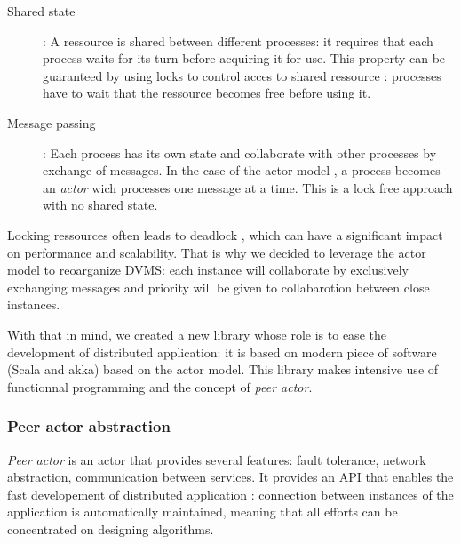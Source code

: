 \begin{description}

	\item [Shared state] : A ressource is shared between different processes: it
	requires that each process waits for its turn before acquiring it for use.
	This property can be guaranteed by using locks to control acces to shared
	ressource : processes have to wait that the ressource becomes free
	before using it.

	\item [Message passing] : Each process has its own state and collaborate
	with other processes by exchange of messages. In the case of the actor model 
	\cite{Hewitt1973}, a process becomes an \emph{actor} wich processes one
	message at a time. This is a lock free approach with no	shared state.

\end{description}

Locking ressources often leads to deadlock \cite{agha:1986}, which can have
a significant impact on performance and scalability. That is why we decided to
leverage the actor model to reoarganize DVMS: each instance will collaborate
by exclusively exchanging messages and priority will be given to collabarotion
between close instances.

With that in mind, we created a new library whose role is to ease the
development of distributed application: it is based on modern piece of software
(Scala and akka) based on the actor model. This library makes intensive use of
functionnal programming and the concept of \emph{peer actor}.

\subsubsection{Peer actor abstraction}

\emph{Peer actor} is an actor that provides several features: fault tolerance,
network abstraction, communication between services. It provides an API that 
enables the fast developement of distributed application : connection between
instances of the application is automatically maintained, meaning that all 
efforts can be concentrated on designing algorithms.

